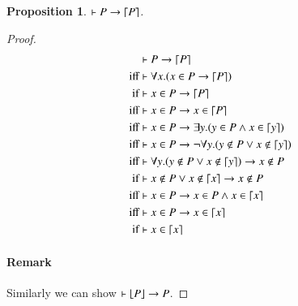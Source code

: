 \documentclass{article}
\theoremstyle{plain}
\newtheorem{prop}[thm]{Proposition}
\DeclarePairedDelimiter\ceil{\lceil}{\rceil}
\DeclarePairedDelimiter\floor{\lfloor}{\rfloor}
\begin{document}
\begin{prop} \label{prop:p->ceilp}
$\vdash P \to \ceil*{P}$.
\end{prop}
\begin{proof}
\begin{align*} 
&\vdash P \to \ceil*{P} \\
{\text{iff}}& \vdash \forall x . (x \in P \to \ceil*{P}) \\
{\text{if}}&  \vdash x \in P \to \ceil*{P} \\
{\text{iff}}& \vdash x \in P \to x \in \ceil*{P} \\
{\text{iff}}& \vdash x \in P \to \exists y . (y \in P \wedge x \in \ceil*{y}) \\
{\text{iff}}& \vdash x \in P \to \neg \forall y . (y \not \in P \vee x \not \in \ceil*{y}) \\
{\text{iff}}& \vdash \forall y . (y \not \in P \vee x \not \in \ceil*{y}) \to x \not \in P \\
{\text{if}}&  \vdash x \not \in P \vee x \not \in \ceil*{x} \to x \not \in P \\
{\text{iff}}& \vdash x \in P \to x \in P \wedge x \in \ceil*{x} \\
{\text{iff}}& \vdash x \in P \to x \in \ceil*{x} \\
{\text{if}}&  \vdash x \in \ceil*{x} \\
\end{align*}
\paragraph{Remark} Similarly we can show $\vdash \floor*{P} \to P$.
\end{proof}
\end{document}
